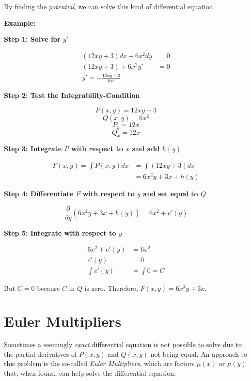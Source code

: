 By finding the \emph{potential}, we can solve this kind of differential equation.

\textbf{Example:}

\textbf{Step 1: Solve for \(y'\)}

\begin{align*}
    (12xy + 3)dx + 6x^2dy & = 0 \\
    (12xy + 3) + 6x^2 y'  & = 0 \\
    y' = - \frac{12xy + 3}{6x^2}
\end{align*}

\textbf{Step 2: Test the Integrability-Condition}

\[
    P(x,y) = 12xy + 3
\]
\[
    Q(x,y) = 6x^2
\]
\[
    P_y = 12x
\]
\[
    Q_x = 12x
\]

\textbf{Step 3: Integrate \(P\) with respect to \(x\) and add \(h(y)\)}

\begin{align*}
    F(x,y) = \int P(x,y) dx & = \int (12xy + 3)dx  \\
                            & = 6x^2 y + 3x + h(y)
\end{align*}

\textbf{Step 4: Differentiate \(F\) with respect to \(y\) and set equal to \(Q\)}

\[
    \frac{\partial}{\partial y}\left(6x^2y + 3x + h(y)\right) = 6x^2 + c'(y)
\]

\textbf{Step 5: Integrate with respect to \(y\)}

\begin{align*}
    6x^2 + c'(y) & = 6x^2       \\
    c'(y)        & = 0          \\
    \int c'(y)   & = \int 0 = C
\end{align*}

But \(C = 0\) because \(C\) in \(Q\) is zero. Therefore, \(F(x,y) = 6x^2y + 3x\).

\section{Euler Multipliers}

Sometimes a seemingly \emph{exact} differential equation is not possible to solve due to the partial
derivatives of \(P(x,y)\) and \(Q(x,y)\) not being equal. An approach to this problem is the so-called
\emph{Euler Multipliers}, which are factors \(\mu(x) \text{ or } \mu(y)\) that, when found, can
help solve the differential equation.

